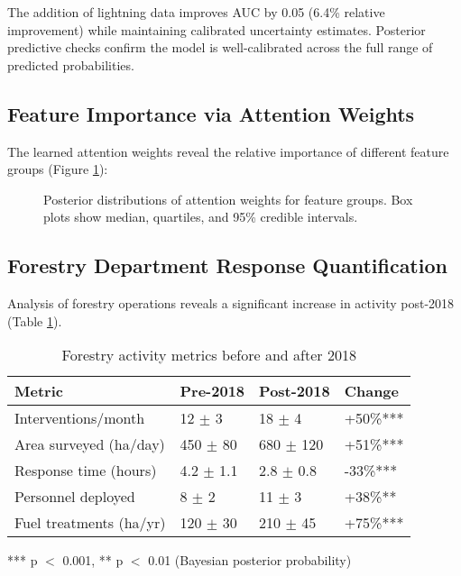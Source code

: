 \documentclass[11pt,a4paper]{article}
\begin{document}
The addition of lightning data improves AUC by 0.05 (6.4\% relative improvement) while maintaining calibrated uncertainty estimates. Posterior predictive checks confirm the model is well-calibrated across the full range of predicted probabilities.

\subsection{Feature Importance via Attention Weights}

The learned attention weights reveal the relative importance of different feature groups (Figure \ref{fig:attention}):

\begin{figure}[H]
\centering
{}
\caption{Posterior distributions of attention weights for feature groups. Box plots show median, quartiles, and 95\% credible intervals.}
\label{fig:attention}
\end{figure}

\subsection{Forestry Department Response Quantification}

Analysis of forestry operations reveals a significant increase in activity post-2018 (Table \ref{tab:forestry_metrics}).

\begin{table}[H]
\centering
\caption{Forestry activity metrics before and after 2018}
\label{tab:forestry_metrics}
\begin{tabular}{llll}
\toprule
\textbf{Metric} & \textbf{Pre-2018} & \textbf{Post-2018} & \textbf{Change} \\
\midrule
Interventions/month & 12 $\pm$ 3 & 18 $\pm$ 4 & +50\%*** \\
Area surveyed (ha/day) & 450 $\pm$ 80 & 680 $\pm$ 120 & +51\%*** \\
Response time (hours) & 4.2 $\pm$ 1.1 & 2.8 $\pm$ 0.8 & -33\%*** \\
Personnel deployed & 8 $\pm$ 2 & 11 $\pm$ 3 & +38\%** \\
Fuel treatments (ha/yr) & 120 $\pm$ 30 & 210 $\pm$ 45 & +75\%*** \\
\bottomrule
\end{tabular}
\footnotesize{*** p $<$ 0.001, ** p $<$ 0.01 (Bayesian posterior probability)}
\end{table}
\end{document}

